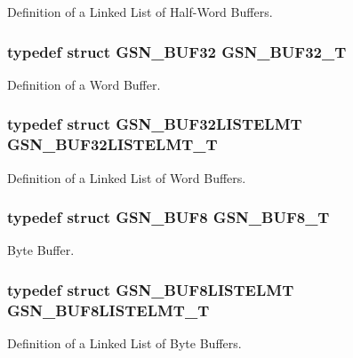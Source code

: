 Definition of a Linked List of Half-\/Word Buffers. 

\hypertarget{a00654_ga8a61cbeed769180229c38ff66d0d820c}{
\subsubsection[{GSN\_\-BUF32\_\-T}]{\setlength{\rightskip}{0pt plus 5cm}typedef struct {\bf GSN\_\-BUF32}  {\bf GSN\_\-BUF32\_\-T}}}
\label{a00654_ga8a61cbeed769180229c38ff66d0d820c}


Definition of a Word Buffer. 

\hypertarget{a00654_ga885b6249f0604d742fc832fa1c221d5e}{
\subsubsection[{GSN\_\-BUF32LISTELMT\_\-T}]{\setlength{\rightskip}{0pt plus 5cm}typedef struct {\bf GSN\_\-BUF32LISTELMT}  {\bf GSN\_\-BUF32LISTELMT\_\-T}}}
\label{a00654_ga885b6249f0604d742fc832fa1c221d5e}


Definition of a Linked List of Word Buffers. 

\hypertarget{a00654_ga5ae3d391ff074ccd3582b1ece95b3424}{
\subsubsection[{GSN\_\-BUF8\_\-T}]{\setlength{\rightskip}{0pt plus 5cm}typedef struct {\bf GSN\_\-BUF8}  {\bf GSN\_\-BUF8\_\-T}}}
\label{a00654_ga5ae3d391ff074ccd3582b1ece95b3424}


Byte Buffer. 

\hypertarget{a00654_ga99a362860e397ed25f4481f88b5b792e}{
\subsubsection[{GSN\_\-BUF8LISTELMT\_\-T}]{\setlength{\rightskip}{0pt plus 5cm}typedef struct {\bf GSN\_\-BUF8LISTELMT}  {\bf GSN\_\-BUF8LISTELMT\_\-T}}}
\label{a00654_ga99a362860e397ed25f4481f88b5b792e}


Definition of a Linked List of Byte Buffers. 


